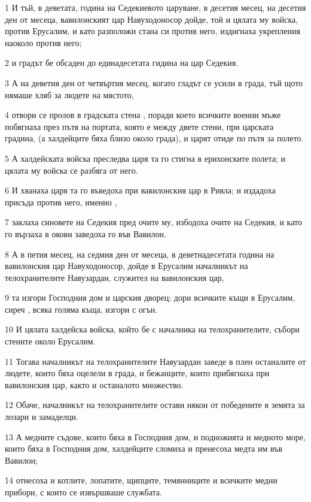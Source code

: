 \par 1 И тъй, в деветата, година на Седекиевото царуване, в десетия месец, на десетия ден от месеца, вавилонският цар Навуходоносор дойде, той и цялата му войска, против Ерусалим, и като разположи стана си против него, издигнаха укрепления наоколо против него;
\par 2 и градът бе обсаден до единадесетата гидина на цар Седекия.
\par 3 А на деветия ден от четвъртия месец, когато гладът се усили в града, тъй щото нямаше хляб за людете на мястото,
\par 4 отвори се пролов в градската стена , поради което всичките военни мъже побягнаха през пътя на портата, която е между двете стени, при царската градина, (а халдейците бяха близо около града), и царят отиде по пътя за полето.
\par 5 А халдейската войска преследва царя та го стигна в ерихонските полета; и цялата му войска се разбяга от него.
\par 6 И хванаха царя та го въведоха при вавилонския цар в Ривла; и издадоха присъда против него, именно ,
\par 7 заклаха синовете на Седекия пред очите му, избодоха очите на Седекия, и като го вързаха в окови заведоха го във Вавилон.
\par 8 А в петия месец, на седмия ден от месеца, в деветнадесетата година на вавилонския цар Навуходоносор, дойде в Ерусалим началникът на телохранителите Навузардан, служител на вавилонския цар,
\par 9 та изгори Господния дом и царския дворец; дори всичките къщи в Ерусалим, сиреч , всяка голяма къща, изгори с огън.
\par 10 И цялата халдейска войска, който бе с началника на телохранителите, събори стените около Ерусалим.
\par 11 Тогава началникът на телохранителите Навузардан заведе в плен останалите от людете, които бяха оцелели в града, и бежанците, които прибягнаха при вавилонския цар, както и останалото множество.
\par 12 Обаче, началникът на телохранителите остави някои от победените в земята за лозари и замаделци.
\par 13 А медните съдове, които бяха в Господния дом, и подножията и медното море, които бяха в Господния дом, халдейците сломиха и пренесоха медта им във Вавилон;
\par 14 отнесоха и котлите, лопатите, щипците, темянниците и всичките медни прибори, с които се извършваше службата.
